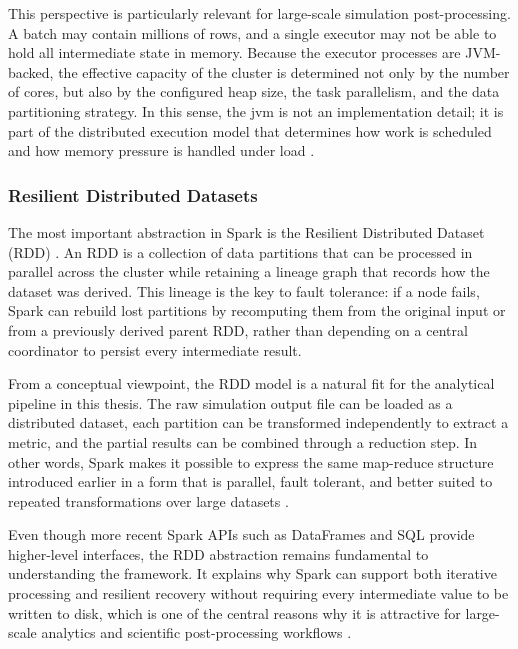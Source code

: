 This perspective is particularly relevant for large-scale simulation post-processing. A batch may contain millions of rows, and a single executor may not be able to hold all intermediate state in memory. Because the executor processes are JVM-backed, the effective capacity of the cluster is determined not only by the number of cores, but also by the configured heap size, the task parallelism, and the data partitioning strategy. In this sense, the \gls{jvm} is not an implementation detail; it is part of the distributed execution model that determines how work is scheduled and how memory pressure is handled under load \parencite{zaharia2012rdd, apachejvm2024}.

\subsubsection{Resilient Distributed Datasets}
\label{subsubsec:cap2-resilient-distributed-datasets}

The most important abstraction in Spark is the Resilient Distributed Dataset (RDD) \parencite{zaharia2012rdd}. An RDD is a collection of data partitions that can be processed in parallel across the cluster while retaining a lineage graph that records how the dataset was derived. This lineage is the key to fault tolerance: if a node fails, Spark can rebuild lost partitions by recomputing them from the original input or from a previously derived parent RDD, rather than depending on a central coordinator to persist every intermediate result.

From a conceptual viewpoint, the RDD model is a natural fit for the analytical pipeline in this thesis. The raw simulation output file can be loaded as a distributed dataset, each partition can be transformed independently to extract a metric, and the partial results can be combined through a reduction step. In other words, Spark makes it possible to express the same map-reduce structure introduced earlier in a form that is parallel, fault tolerant, and better suited to repeated transformations over large datasets \parencite{zaharia2012rdd,sparkrddguide2024}.

Even though more recent Spark APIs such as DataFrames and SQL provide higher-level interfaces, the RDD abstraction remains fundamental to understanding the framework. It explains why Spark can support both iterative processing and resilient recovery without requiring every intermediate value to be written to disk, which is one of the central reasons why it is attractive for large-scale analytics and scientific post-processing workflows \parencite{armbrust2015sparksql,zaharia2012rdd}.

